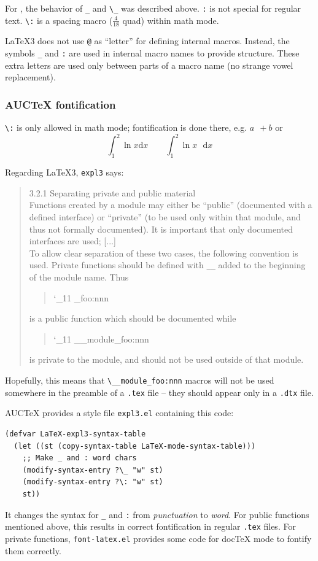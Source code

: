 \documentclass[a4paper]{article}
\begin{document}
For \LaTeXe, the behavior of \verb|_| and \verb|\_| was described
above.  \verb|:| is not special for regular text.  \verb|\:| is a
spacing macro ($\frac{4}{18}$ quad) within math mode.

\LaTeX3 does not use \verb|@| as ``letter'' for defining internal
macros.  Instead, the symbols \verb|_| and \verb|:| are used in
internal macro names to provide structure.  These extra letters are
used only between parts of a macro name (no strange vowel
replacement)\cite{expl3}.

\subsubsection{AUC\protect\TeX{} fontification}

\verb|\:| is only allowed in math mode; fontification is done there,
e.g. $a\:\:+b$ or
\begin{equation}
  \int_1^2 \ln x \mathrm{d}x
  \qquad
  \int_1^2 \ln x \:\:\:\mathrm{d}x
\end{equation}

Regarding \LaTeX3, \verb|expl3| says:
\begin{quote}
  3.2.1 Separating private and public material \\
  Functions created by a module may either be ``public'' (documented
  with a defined interface) or ``private'' (to be used only within
  that module, and thus not formally documented).  It is important
  that only documented interfaces are used; [...] \\
  To allow clear separation of these two cases, the following
  convention is used. Private functions should be defined with
  \verb|__| added to the beginning of the module name. Thus
  \begin{quote}
    \ttfamily \catcode`\_11\relax
    \string\module_foo:nnn
  \end{quote}
  is a public function which should be documented while
  \begin{quote}
    \ttfamily \catcode`\_11\relax
    \string\__module_foo:nnn
  \end{quote}
  is private to the module, and should not be used outside of that
  module.
\end{quote}
%
Hopefully, this means that \verb|\__module_foo:nnn| macros will not be
used somewhere in the preamble of a \verb|.tex| file -- they should
appear only in a \verb|.dtx| file.

AUC\TeX{} provides a style file \verb|expl3.el| containing this code:
\begin{verbatim}
(defvar LaTeX-expl3-syntax-table
  (let ((st (copy-syntax-table LaTeX-mode-syntax-table)))
    ;; Make _ and : word chars
    (modify-syntax-entry ?\_ "w" st)
    (modify-syntax-entry ?\: "w" st)
    st))
\end{verbatim}
It changes the syntax for \verb|_| and \verb|:| from
\textsl{punctuation} to \textsl{word}.  For public functions mentioned
above, this results in correct fontification in regular \verb|.tex|
files.  For private functions, \verb|font-latex.el| provides some code
for doc\TeX{} mode to fontify them correctly.
\end{document}
